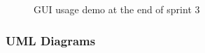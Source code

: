 \documentclass[11pt]{article} %
\begin{document}
{  \begin{figure}[H]
  	\centering
  	\caption{GUI usage demo at the end of sprint 3}
  	\label{fig:GUI Design 5 demo}
  \end{figure}
  
  


\newpage
\subsubsection{UML Diagrams}

}
\end{document}
